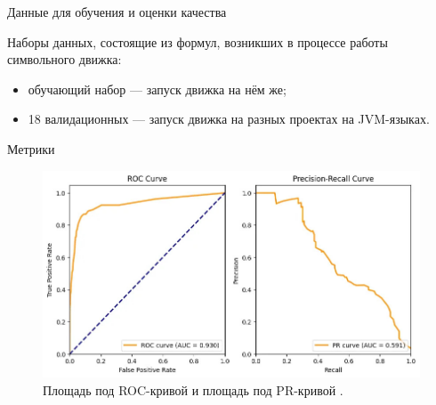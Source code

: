\documentclass[14pt,aspectratio=169,hyperref={pdftex,unicode},xcolor=dvipsnames]{beamer}
\begin{document}
\begin{frame}{Данные для обучения и оценки качества}
\begin{minipage}{0.5\textwidth}
\end{minipage}%
\begin{minipage}{0.5\textwidth}

Наборы данных, состоящие из формул, возникших в процессе работы символьного движка:

\begin{itemize}
  \item обучающий набор --- запуск движка на нём же;
  \item 18 валидационных --- запуск движка на разных проектах на JVM-языках.
\end{itemize}

\end{minipage}

\end{frame}



\begin{frame}{Метрики}

\begin{figure}[ht]
\begin{center}
  \includegraphics[scale=0.35]{./assets/roc-auc-vs-au-prc.jpg}
  \caption{Площадь под ROC-кривой и площадь под PR-кривой \cite{roc-auc-and-avg-prc}.}
\end{center}
\end{figure}


\end{frame}
\end{document}

